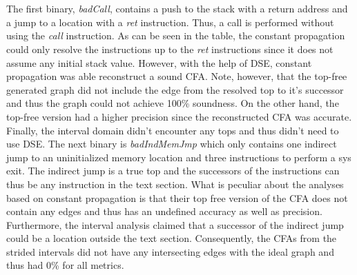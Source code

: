 \documentclass{kththesis}
\renewcommand{\it}[1]{\textit{#1}}
\begin{document}
\\ \\
The first binary, \it{badCall}, contains a push to the stack with a return address and a jump to a location with a \it{ret} instruction. Thus, a call is performed without using the \it{call} instruction. As can be seen in the table, the constant propagation could only resolve the instructions up to the \it{ret} instructions since it does not assume any initial stack value. However, with the help of DSE, constant propagation was able reconstruct a sound CFA. Note, however, that the top-free generated graph did not include the edge from the resolved top to it's successor and thus the graph could not achieve 100\% soundness. On the other hand, the top-free version had a higher precision since the reconstructed CFA was accurate. Finally, the interval domain didn't encounter any tops and thus didn't need to use DSE.
\clearpage
\noindent
The next binary is \it{badIndMemJmp} which only contains one indirect jump to an uninitialized memory location and three instructions to perform a sys exit. The indirect jump is a true top and the successors of the instructions can thus be any instruction in the text section.  What is peculiar about the analyses based on constant propagation is that their top free version of the CFA does not contain any edges and thus has an undefined accuracy as well as precision. Furthermore, the interval analysis claimed that a successor of the indirect jump could be a location outside the text section. Consequently, the CFAs from the strided intervals did not have any intersecting edges with the ideal graph and thus had 0\% for all metrics.
\end{document}
